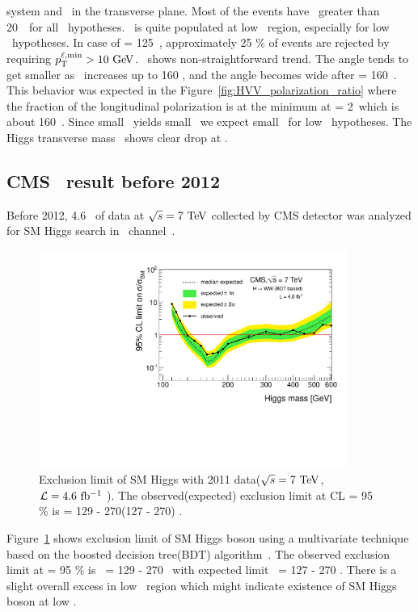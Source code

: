 system and \met\ in the transverse plane.
Most of the events have \ptlmax\ greater than 20~\GeV\ for all \mHi\ hypotheses. 
\ptlmin\ is quite populated at low \ptlmin\ region, especially for low \mHi\ 
hypotheses. In case of \mHi = 125~\GeV, approximately 25 \% of 
events are rejected by requiring $p_{\mathrm{T}}^{\ell,\mathrm{min}}>10~\mathrm{Ge\kern -0.1em V}$. 
\delphill\ shows non-straightforward trend. The angle tends to get smaller 
as \mHi\ increases up to 160 \GeV, and the angle becomes wide 
after \mHi = 160~\GeV. This behavior was expected in the 
Figure~\ref{fig:HVV_polarization_ratio} where the fraction of the 
longitudinal polarization is at the minimum at \mHi = 2\mW\ which is about 160~\GeV. 
Since small \delphill\ yields small \mll\, we expect small \mll\ 
for low \mHi\ hypotheses. The Higgs transverse mass \mT\ shows clear 
drop at \mHi. 

%
\subsection{CMS \hww\ result before 2012}

Before 2012, 4.6 \ifb\ of data at $\sqrt{s}=7~\mathrm{Te\kern -0.1em V}$ collected by CMS detector 
was analyzed for SM Higgs search in \hww\ channel~\cite{Chatrchyan:2012ty}. 
\begin{figure}
\centering
\includegraphics[width=0.9\textwidth]{figures/limits_nj_shape.pdf}
\caption{ Exclusion limit of SM Higgs with 2011 data($\sqrt{s}=7~\mathrm{Te\kern -0.1em V}$, $\mathcal{L}=4.6~\mathrm{fb^{-1}}$ ).
The observed(expected) exclusion limit at CL  = 95 \% is \mHi = 129 - 270(127 - 270) \GeV.}
\label{fig:hww2011}
\end{figure}
Figure~\ref{fig:hww2011} shows exclusion limit of SM Higgs boson 
using a multivariate technique based on the boosted decision tree(BDT) algorithm~\cite{Chatrchyan:2012ty}.
The observed exclusion limit at \CLs  = 95 \% is \mHi\ = 129 - 270 \GeV\
with expected limit \mHi\ = 127 - 270 \GeV. There is a slight overall excess 
in low \mHi\ region which might indicate existence of SM Higgs boson at low \mHi.  


